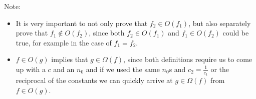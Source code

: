 Note:
\begin{itemize}
    \item It is very important to not only prove that $f_2 \in{} O(f_1)$, but also separately prove that $f_1 \notin{} O(f_2)$, since both $f_2 \in{} O(f_1)$ and $f_1 \in{} O(f_2)$ could be true, for example in the case of $f_1 = f_2$.
    \item $f\in{}O(g)$ implies that $g\in{}\Omega(f)$, since both definitions require us to come up with a $c$ and an $n_0$ and if we used the same $n_0$s and $c_2 = \frac{1}{c_1}$ or the reciprocal of the constants we can quickly arrive at $g\in{}\Omega(f)$ from $f\in{}O(g)$.
\end{itemize}